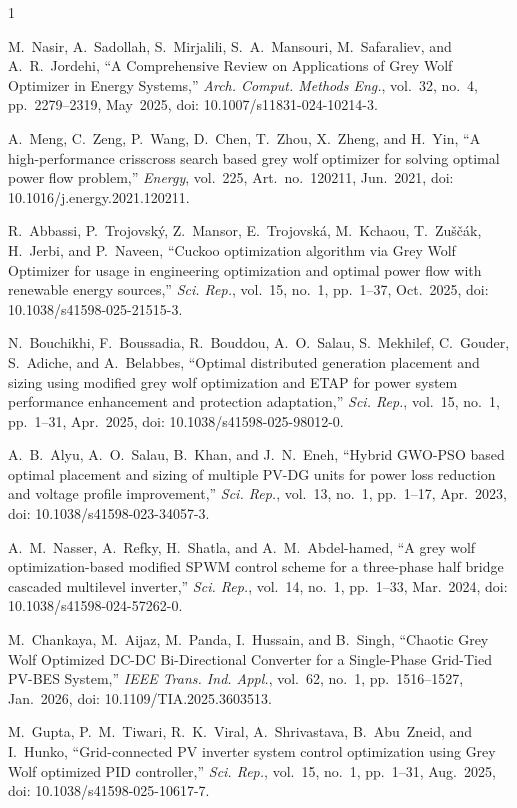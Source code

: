 \begin{thebibliography}{1}

 M.~Nasir, A.~Sadollah, S.~Mirjalili, S.~A.~Mansouri, M.~Safaraliev, and A.~R.~Jordehi, ``A Comprehensive Review on Applications of Grey Wolf Optimizer in Energy Systems,'' \textit{Arch. Comput. Methods Eng.}, vol.~32, no.~4, pp.~2279--2319, May~2025, doi: 10.1007/s11831-024-10214-3.

 A.~Meng, C.~Zeng, P.~Wang, D.~Chen, T.~Zhou, X.~Zheng, and H.~Yin, ``A high-performance crisscross search based grey wolf optimizer for solving optimal power flow problem,'' \textit{Energy}, vol.~225, Art.~no.~120211, Jun.~2021, doi: 10.1016/j.energy.2021.120211.

 R.~Abbassi, P.~Trojovsk\'{y}, Z.~Mansor, E.~Trojovsk\'{a}, M.~Kchaou, T.~Zu\v{s}\v{c}\'{a}k, H.~Jerbi, and P.~Naveen, ``Cuckoo optimization algorithm via Grey Wolf Optimizer for usage in engineering optimization and optimal power flow with renewable energy sources,'' \textit{Sci. Rep.}, vol.~15, no.~1, pp.~1--37, Oct.~2025, doi: 10.1038/s41598-025-21515-3.

 N.~Bouchikhi, F.~Boussadia, R.~Bouddou, A.~O.~Salau, S.~Mekhilef, C.~Gouder, S.~Adiche, and A.~Belabbes, ``Optimal distributed generation placement and sizing using modified grey wolf optimization and ETAP for power system performance enhancement and protection adaptation,'' \textit{Sci. Rep.}, vol.~15, no.~1, pp.~1--31, Apr.~2025, doi: 10.1038/s41598-025-98012-0.

 A.~B.~Alyu, A.~O.~Salau, B.~Khan, and J.~N.~Eneh, ``Hybrid GWO-PSO based optimal placement and sizing of multiple PV-DG units for power loss reduction and voltage profile improvement,'' \textit{Sci. Rep.}, vol.~13, no.~1, pp.~1--17, Apr.~2023, doi: 10.1038/s41598-023-34057-3.

 A.~M.~Nasser, A.~Refky, H.~Shatla, and A.~M.~Abdel-hamed, ``A grey wolf optimization-based modified SPWM control scheme for a three-phase half bridge cascaded multilevel inverter,'' \textit{Sci. Rep.}, vol.~14, no.~1, pp.~1--33, Mar.~2024, doi: 10.1038/s41598-024-57262-0.

 M.~Chankaya, M.~Aijaz, M.~Panda, I.~Hussain, and B.~Singh, ``Chaotic Grey Wolf Optimized DC-DC Bi-Directional Converter for a Single-Phase Grid-Tied PV-BES System,'' \textit{IEEE Trans. Ind. Appl.}, vol.~62, no.~1, pp.~1516--1527, Jan.~2026, doi: 10.1109/TIA.2025.3603513.

 M.~Gupta, P.~M.~Tiwari, R.~K.~Viral, A.~Shrivastava, B.~Abu~Zneid, and I.~Hunko, ``Grid-connected PV inverter system control optimization using Grey Wolf optimized PID controller,'' \textit{Sci. Rep.}, vol.~15, no.~1, pp.~1--31, Aug.~2025, doi: 10.1038/s41598-025-10617-7.


\end{thebibliography}
